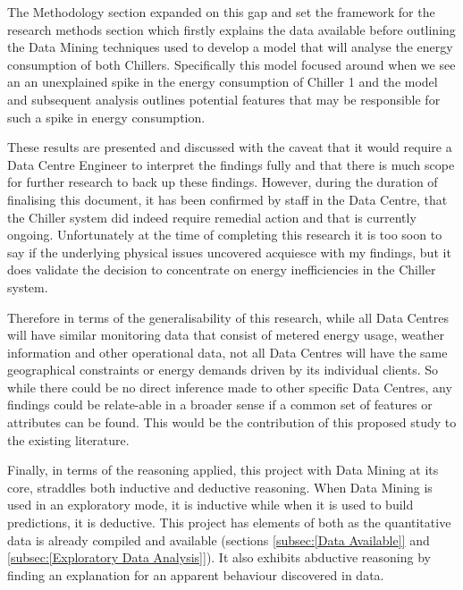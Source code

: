 \documentclass[12pt]{scrartcl}
\begin{document}
The Methodology section expanded on this gap and set the framework for the research methods section which firstly explains the data available before outlining the Data Mining techniques used to develop a model that will analyse the energy consumption of both Chillers. Specifically this model focused around when we see an an unexplained spike in the energy consumption of Chiller 1 and the model and subsequent analysis outlines potential features that may be responsible for such a spike in energy consumption. 

These results are presented and discussed with the caveat that it would require a Data Centre Engineer to interpret the findings fully and that there is much scope for further research to back up these findings. However, during the duration of finalising this document, it has been confirmed by staff in the Data Centre, that the Chiller system did indeed require remedial action and that is currently ongoing. Unfortunately at the time of completing this research it is too soon to say if the underlying physical issues uncovered acquiesce with my findings, but it does validate the decision to concentrate on energy inefficiencies in the Chiller system.       

Therefore in terms of the generalisability of this research, while all Data Centres will have similar monitoring data that consist of metered energy usage, weather information and other operational data, not all Data Centres will have the same geographical constraints or energy demands driven by its individual clients. So while there could be no direct inference made to other specific Data Centres, any findings could be relate-able in a broader sense if a common set of features or attributes can be found. This would be the contribution of this proposed study to the existing literature.    

Finally, in terms of the reasoning applied, this project with Data Mining at its core, straddles both inductive and deductive reasoning. When Data Mining is used in an exploratory mode, it is inductive while when it is used to build predictions, it is deductive. This project has elements of both as the quantitative data is already compiled and available (sections \ref{subsec:[Data Available]} and \ref{subsec:[Exploratory Data Analysis]}). It also exhibits abductive reasoning by finding an explanation for an apparent behaviour discovered in data. 

\newpage
\printbibliography[heading=bibintoc]
\newpage
\glsaddall
\printglossary
\newpage
\appendix
\appendixpage
\addappheadtotoc
\end{document}
